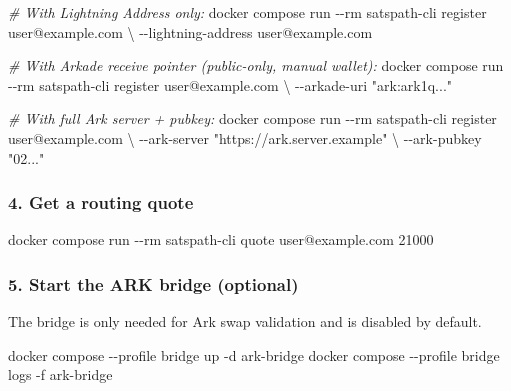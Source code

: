 \documentclass[
]{article}
\newenvironment{Shaded}{}{}
\newcommand{\AttributeTok}[1]{\textcolor[rgb]{0.49,0.56,0.16}{#1}}
\newcommand{\CommentTok}[1]{\textcolor[rgb]{0.38,0.63,0.69}{\textit{#1}}}
\newcommand{\DataTypeTok}[1]{\textcolor[rgb]{0.56,0.13,0.00}{#1}}
\newcommand{\ExtensionTok}[1]{#1}
\newcommand{\NormalTok}[1]{#1}
\newcommand{\StringTok}[1]{\textcolor[rgb]{0.25,0.44,0.63}{#1}}
\begin{document}
\begin{Shaded}
\begin{Highlighting}[]
\CommentTok{\# With Lightning Address only:}
\ExtensionTok{docker}\NormalTok{ compose run }\AttributeTok{{-}{-}rm}\NormalTok{ satspath{-}cli register user@example.com }\DataTypeTok{\textbackslash{}}
  \AttributeTok{{-}{-}lightning{-}address}\NormalTok{ user@example.com}

\CommentTok{\# With Arkade receive pointer (public{-}only, manual wallet):}
\ExtensionTok{docker}\NormalTok{ compose run }\AttributeTok{{-}{-}rm}\NormalTok{ satspath{-}cli register user@example.com }\DataTypeTok{\textbackslash{}}
  \AttributeTok{{-}{-}arkade{-}uri} \StringTok{"ark:ark1q..."}

\CommentTok{\# With full Ark server + pubkey:}
\ExtensionTok{docker}\NormalTok{ compose run }\AttributeTok{{-}{-}rm}\NormalTok{ satspath{-}cli register user@example.com }\DataTypeTok{\textbackslash{}}
  \AttributeTok{{-}{-}ark{-}server} \StringTok{"https://ark.server.example"} \DataTypeTok{\textbackslash{}}
  \AttributeTok{{-}{-}ark{-}pubkey} \StringTok{"02..."}
\end{Highlighting}
\end{Shaded}

\hypertarget{get-a-routing-quote}{%
\subsubsection{4. Get a routing quote}\label{get-a-routing-quote}}

\begin{Shaded}
\begin{Highlighting}[]
\ExtensionTok{docker}\NormalTok{ compose run }\AttributeTok{{-}{-}rm}\NormalTok{ satspath{-}cli quote user@example.com 21000}
\end{Highlighting}
\end{Shaded}

\hypertarget{start-the-ark-bridge-optional}{%
\subsubsection{5. Start the ARK bridge
(optional)}\label{start-the-ark-bridge-optional}}

The bridge is only needed for Ark swap validation and is disabled by
default.

\begin{Shaded}
\begin{Highlighting}[]
\ExtensionTok{docker}\NormalTok{ compose }\AttributeTok{{-}{-}profile}\NormalTok{ bridge up }\AttributeTok{{-}d}\NormalTok{ ark{-}bridge}
\ExtensionTok{docker}\NormalTok{ compose }\AttributeTok{{-}{-}profile}\NormalTok{ bridge logs }\AttributeTok{{-}f}\NormalTok{ ark{-}bridge}
\end{Highlighting}
\end{Shaded}
\end{document}
